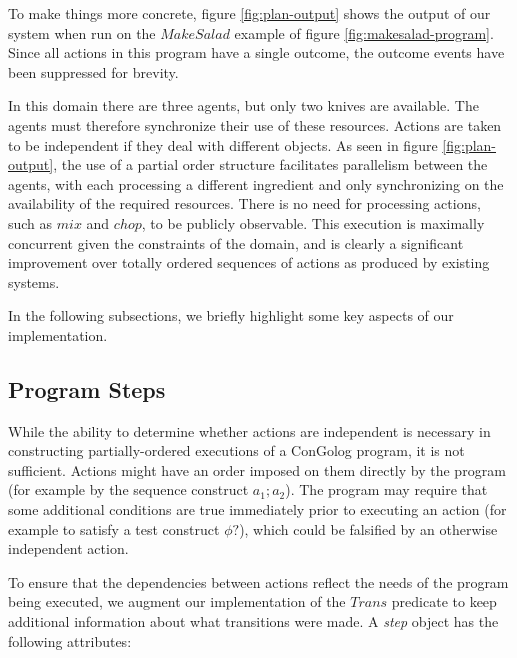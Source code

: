 To make things more concrete, figure \ref{fig:plan-output} shows
the output of our system when run on the $MakeSalad$ example of figure
\ref{fig:makesalad-program}. Since all actions in this program have
a single outcome, the outcome events have been suppressed for brevity.

In this domain there are three agents, but only two knives are available.
The agents must therefore synchronize their use of these resources.
Actions are taken to be independent if they deal with different objects.
As seen in figure \ref{fig:plan-output}, the use of a partial order
structure facilitates parallelism between the agents, with each processing
a different ingredient and only synchronizing on the availability
of the required resources. There is no need for processing actions,
such as $mix$ and $chop$, to be publicly observable. This execution
is maximally concurrent given the constraints of the domain, and is
clearly a significant improvement over totally ordered sequences of
actions as produced by existing systems.

In the following subsections, we briefly highlight some key aspects
of our implementation.


\subsection{Program Steps}

While the ability to determine whether actions are independent is
necessary in constructing partially-ordered executions of a ConGolog
program, it is not sufficient. Actions might have an order imposed
on them directly by the program (for example by the sequence construct
$a_{1};a_{2}$). The program may require that some additional conditions
are true immediately prior to executing an action (for example to
satisfy a test construct $\phi?$), which could be falsified by an
otherwise independent action.

To ensure that the dependencies between actions reflect the needs
of the program being executed, we augment our implementation of the
$Trans$ predicate to keep additional information about what transitions
were made. A \emph{step} object has the following attributes:

